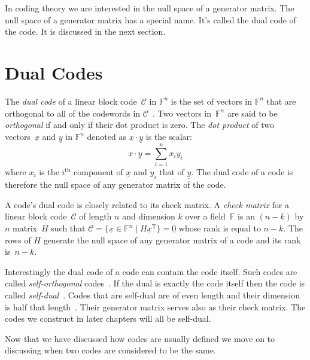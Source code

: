 In coding theory we are interested in the null space of a generator matrix.
The null space of a generator matrix has a special name.
It's called the dual code of the code.
It is discussed in the next section.

\section{Dual Codes}
\label{sect:dualcode}
The \emph{dual code} of a linear block code~$\mathcal{C}$ in $\mathbb{F}^n$ is the set of vectors in $\mathbb{F}^n$ that are orthogonal to all of the codewords in $\mathcal{C}$~\cite[p.~26]{mac77}.
Two vectors in~$\mathbb{F}^n$ are said to be \emph{orthogonal} if and only if their dot product is zero.
The \emph{dot product} of two vectors~$\underline{x}$ and $\underline{y}$ in $\mathbb{F}^n$ denoted as $\underline{x} \cdot \underline{y}$ is the scalar:
\[ \underline{x} \cdot \underline{y} = \sum_{i=1}^{n} x_i y_i \]
where $x_i$ is the $i^{\textrm{th}}$ component of $\underline{x}$ and $y_i$ that of $\underline{y}$.
The dual code of a code is therefore the null space of any generator matrix of the code.

A code's dual code is closely related to its check matrix.
A \emph{check matrix} for a linear block code~$\mathcal{C}$ of length $n$ and dimension $k$ over a field~$\mathbb{F}$ is an $(n-k)$ by $n$ matrix~$H$ such that $\mathcal{C} = \{ \underline{x} \in \mathbb{F}^n \mid H \underline{x}^{\textrm{T}} \} = \underline{0}$ whose rank is equal to $n-k$.
The rows of $H$ generate the null space of any generator matrix of a code and its rank is~$n-k$.

Interestingly the dual code of a code can contain the code itself.
Such codes are called \emph{self-orthogonal} codes~\cite[p.~6]{huf03}.
If the dual is exactly the code itself then the code is called \emph{self-dual}~\cite[p.~6]{huf03}.
Codes that are self-dual are of even length and their dimension is half that length~\cite[p.~6]{huf03}.
Their generator matrix serves also as their check matrix.
The codes we construct in later chapters will all be self-dual.

Now that we have discussed how codes are usually defined we move on to discussing when two codes are considered to be the same.


